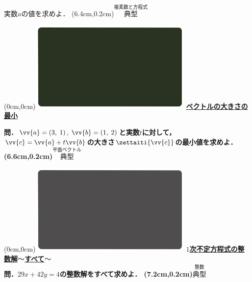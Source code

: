 \documentclass[10pt,
fleqn,
dvipdfmx,
uplatex
]{jsarticle}
\begin{document}
\vspace{-0.2zw}
\hfill 実数$a$の値を求めよ．
\at(6.4cm,0.2cm){\small\color{bradorange}$\overset{\text{複素数と方程式}}{\text{典型}}$}



\newpage



\at(0cm,0cm){\includegraphics[width=8cm,bb=0 0 1920 1080]{./youtube/thumbnails/templates/smart_background/平面ベクトル.jpeg}}
{\color{orange}\bf\boldmath\LARGE\underline{ベクトルの大きさの最小}}\vspace{0.3zw}

\Large 
\bf\boldmath 問．$\vv {a}=\left(3,\;1\right),\;\vv {b}=\left(1,\;2\right)$と実数$t$に対して，$\vv {c}=\vv {a}+t\vv {b}$の大きさ$\zettaiti{\vv {c}}$の最小値を求めよ．
\at(6.6cm,0.2cm){\small\color{bradorange}$\overset{\text{平面ベクトル}}{\text{典型}}$}


\newpage

\at(0cm,0cm){\includegraphics[width=8cm,bb=0 0 1920 1080]{./youtube/thumbnails/templates/smart_background/整数.jpeg}}
{\color{orange}\bf\boldmath\large\underline{$1$次不定方程式の整数解$〜$すべて$〜$}}\vspace{0.3zw}\\
\huge 
\bf\boldmath 問．${29}x+{42}y=4$の整数解をすべて求めよ．
\at(7.2cm,0.2cm){\small\color{bradorange}$\overset{\text{整数}}{\text{典型}}$}

\newpage
\end{document}
